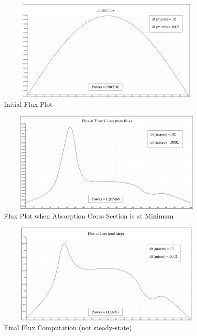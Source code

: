 \documentclass[12pt]{article}
\begin{document}
\begin{figure}[!htbp]
\begin{center}
\includegraphics[width=5in,height=2in]{figures/initial_flux.jpg}
\caption{Initial Flux Plot}
\label{fig:initial}
\end{center}
\end{figure}

\begin{figure}[!htbp]
\begin{center}
\includegraphics[width=5in,height=2in]{figures/max_flux.jpg}
\caption{Flux Plot when Absorption Cross Section is at Minimum}
\label{fig:max}
\end{center}
\end{figure}

\begin{figure}[!htbp]
\begin{center}
\includegraphics[width=5in,height=2in]{figures/final_flux.jpg}
\caption{Final Flux Computation (not steady-state)}
\label{fig:final}
\end{center}
\end{figure}
\end{document}
